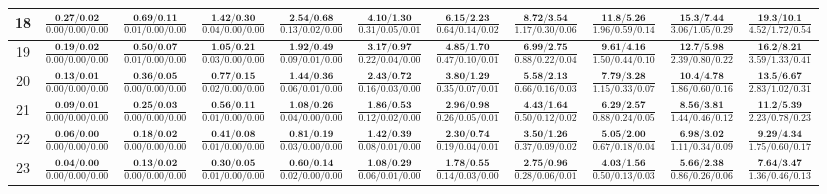 \documentclass{slides}
\begin{document}
{{{\begin{tabular}{|c|c|c|c|c|c|c|c|c|c|c|}
\hline
18 & $\frac{\textbf{0.27/0.02}}{0.00/0.00/0.00}$ & $\frac{\textbf{0.69/0.11}}{0.01/0.00/0.00}$ & $\frac{\textbf{1.42/0.30}}{0.04/0.00/0.00}$ & $\frac{\textbf{2.54/0.68}}{0.13/0.02/0.00}$ & $\frac{\textbf{4.10/1.30}}{0.31/0.05/0.01}$ & $\frac{\textbf{6.15/2.23}}{0.64/0.14/0.02}$ & $\frac{\textbf{8.72/3.54}}{1.17/0.30/0.06}$ & $\frac{\textbf{11.8/5.26}}{1.96/0.59/0.14}$ & $\frac{\textbf{15.3/7.44}}{3.06/1.05/0.29}$ & $\frac{\textbf{19.3/10.1}}{4.52/1.72/0.54}$ \\
\hline
19 & $\frac{\textbf{0.19/0.02}}{0.00/0.00/0.00}$ & $\frac{\textbf{0.50/0.07}}{0.01/0.00/0.00}$ & $\frac{\textbf{1.05/0.21}}{0.03/0.00/0.00}$ & $\frac{\textbf{1.92/0.49}}{0.09/0.01/0.00}$ & $\frac{\textbf{3.17/0.97}}{0.22/0.04/0.00}$ & $\frac{\textbf{4.85/1.70}}{0.47/0.10/0.01}$ & $\frac{\textbf{6.99/2.75}}{0.88/0.22/0.04}$ & $\frac{\textbf{9.61/4.16}}{1.50/0.44/0.10}$ & $\frac{\textbf{12.7/5.98}}{2.39/0.80/0.22}$ & $\frac{\textbf{16.2/8.21}}{3.59/1.33/0.41}$ \\
\hline
20 & $\frac{\textbf{0.13/0.01}}{0.00/0.00/0.00}$ & $\frac{\textbf{0.36/0.05}}{0.00/0.00/0.00}$ & $\frac{\textbf{0.77/0.15}}{0.02/0.00/0.00}$ & $\frac{\textbf{1.44/0.36}}{0.06/0.01/0.00}$ & $\frac{\textbf{2.43/0.72}}{0.16/0.03/0.00}$ & $\frac{\textbf{3.80/1.29}}{0.35/0.07/0.01}$ & $\frac{\textbf{5.58/2.13}}{0.66/0.16/0.03}$ & $\frac{\textbf{7.79/3.28}}{1.15/0.33/0.07}$ & $\frac{\textbf{10.4/4.78}}{1.86/0.60/0.16}$ & $\frac{\textbf{13.5/6.67}}{2.83/1.02/0.31}$ \\
\hline
21 & $\frac{\textbf{0.09/0.01}}{0.00/0.00/0.00}$ & $\frac{\textbf{0.25/0.03}}{0.00/0.00/0.00}$ & $\frac{\textbf{0.56/0.11}}{0.01/0.00/0.00}$ & $\frac{\textbf{1.08/0.26}}{0.04/0.00/0.00}$ & $\frac{\textbf{1.86/0.53}}{0.12/0.02/0.00}$ & $\frac{\textbf{2.96/0.98}}{0.26/0.05/0.01}$ & $\frac{\textbf{4.43/1.64}}{0.50/0.12/0.02}$ & $\frac{\textbf{6.29/2.57}}{0.88/0.24/0.05}$ & $\frac{\textbf{8.56/3.81}}{1.44/0.46/0.12}$ & $\frac{\textbf{11.2/5.39}}{2.23/0.78/0.23}$ \\
\hline
22 & $\frac{\textbf{0.06/0.00}}{0.00/0.00/0.00}$ & $\frac{\textbf{0.18/0.02}}{0.00/0.00/0.00}$ & $\frac{\textbf{0.41/0.08}}{0.01/0.00/0.00}$ & $\frac{\textbf{0.81/0.19}}{0.03/0.00/0.00}$ & $\frac{\textbf{1.42/0.39}}{0.08/0.01/0.00}$ & $\frac{\textbf{2.30/0.74}}{0.19/0.04/0.01}$ & $\frac{\textbf{3.50/1.26}}{0.37/0.09/0.02}$ & $\frac{\textbf{5.05/2.00}}{0.67/0.18/0.04}$ & $\frac{\textbf{6.98/3.02}}{1.11/0.34/0.09}$ & $\frac{\textbf{9.29/4.34}}{1.75/0.60/0.17}$ \\
\hline
23 & $\frac{\textbf{0.04/0.00}}{0.00/0.00/0.00}$ & $\frac{\textbf{0.13/0.02}}{0.00/0.00/0.00}$ & $\frac{\textbf{0.30/0.05}}{0.01/0.00/0.00}$ & $\frac{\textbf{0.60/0.14}}{0.02/0.00/0.00}$ & $\frac{\textbf{1.08/0.29}}{0.06/0.01/0.00}$ & $\frac{\textbf{1.78/0.55}}{0.14/0.03/0.00}$ & $\frac{\textbf{2.75/0.96}}{0.28/0.06/0.01}$ & $\frac{\textbf{4.03/1.56}}{0.50/0.13/0.03}$ & $\frac{\textbf{5.66/2.38}}{0.86/0.26/0.06}$ & $\frac{\textbf{7.64/3.47}}{1.36/0.46/0.13}$ \\

\end{tabular}}}}
\end{document}
